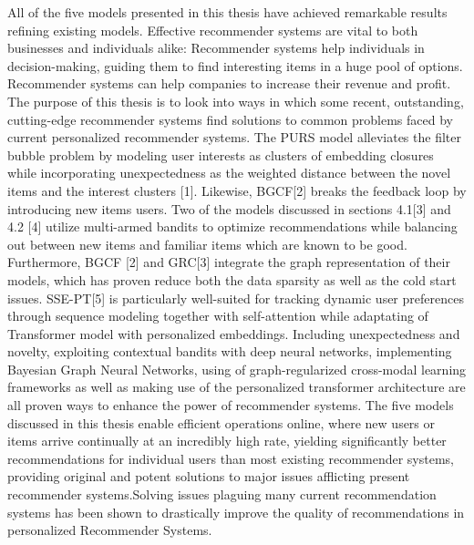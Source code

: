 All of the five models presented in this thesis have achieved remarkable results refining existing models. Effective recommender systems are vital to both businesses and individuals alike: Recommender systems help individuals in decision-making, guiding them to find interesting items in a huge pool of options. Recommender systems can help companies to increase their revenue and profit. The purpose of this thesis is to look into ways in which some recent, outstanding, cutting-edge recommender systems find solutions to common problems faced by current personalized recommender systems.
The PURS model alleviates the filter bubble problem by modeling user interests as clusters of embedding closures while incorporating unexpectedness as the weighted distance between the novel items and the interest clusters [1]. Likewise, BGCF[2] breaks the feedback loop by introducing new items users.
Two of the models discussed in sections  4.1[3] and 4.2 [4] utilize multi-armed bandits to optimize recommendations while balancing out between new items and familiar items which are known to be good.  Furthermore, BGCF [2] and GRC[3] integrate the graph representation of their models, which has proven reduce both the data sparsity as well as the cold start issues. SSE-PT[5] is particularly well-suited for tracking dynamic user preferences through sequence modeling together with self-attention  while adaptating of Transformer model with personalized embeddings. 
Including unexpectedness and novelty, exploiting contextual bandits with deep neural networks, implementing Bayesian Graph Neural Networks, using of graph-regularized cross-modal learning frameworks as well as making use of the personalized transformer architecture are all proven ways to enhance the power of recommender systems. The five models discussed in this thesis enable efficient operations online, where new users or items arrive continually at an incredibly high rate, yielding significantly better recommendations for individual users than most existing recommender systems, providing original and potent solutions to major issues afflicting present recommender systems.Solving issues plaguing many current recommendation systems has been shown to drastically improve the quality of recommendations in personalized Recommender Systems. 
